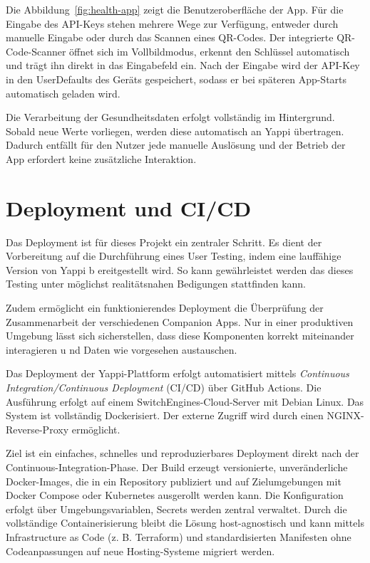 \documentclass[12pt,a4paper]{report}
\begin{document}
Die Abbildung~\ref{fig:health-app} zeigt die Benutzeroberfläche der App. Für die Eingabe des API-Keys stehen mehrere Wege zur
Verfügung, entweder durch manuelle Eingabe oder durch das Scannen eines QR-Codes. Der integrierte QR-Code-Scanner öffnet sich im
Vollbildmodus, erkennt den Schlüssel automatisch und trägt ihn direkt in das Eingabefeld ein. Nach der Eingabe wird der API-Key
in den UserDefaults des Geräts gespeichert, sodass er bei späteren App-Starts automatisch geladen wird.

Die Verarbeitung der Gesundheitsdaten erfolgt vollständig im Hintergrund. Sobald neue Werte vorliegen, werden diese automatisch an
Yappi übertragen. Dadurch entfällt für den Nutzer jede manuelle Auslösung und der Betrieb der App erfordert keine zusätzliche
Interaktion.


\section{Deployment und CI/CD}

    Das Deployment ist für dieses Projekt ein zentraler Schritt.
    Es dient der Vorbereitung auf die Durchführung eines User Testing, indem eine lauffähige Version von Yappi b
    ereitgestellt wird. So kann gewährleistet werden das dieses Testing unter möglichst realitätsnahen Bedigungen stattfinden kann.

    Zudem ermöglicht ein funktionierendes Deployment die Überprüfung der Zusammenarbeit der verschiedenen Companion Apps.
    Nur in einer produktiven Umgebung lässt sich sicherstellen, dass diese Komponenten korrekt miteinander interagieren u
    nd Daten wie vorgesehen austauschen.

    Das Deployment der Yappi-Plattform erfolgt automatisiert mittels \textit{Continuous Integration/Continuous Deployment}
    (CI/CD) über GitHub Actions. Die Ausführung erfolgt auf einem SwitchEngines-Cloud-Server mit Debian Linux.
    Das System ist vollständig Dockerisiert. Der externe Zugriff wird durch einen NGINX-Reverse-Proxy ermöglicht.

    Ziel ist ein einfaches, schnelles und reproduzierbares Deployment direkt nach der Continuous-Integration-Phase.
    Der Build erzeugt versionierte, unveränderliche Docker-Images, die in ein Repository publiziert und auf
    Zielumgebungen mit Docker Compose oder Kubernetes ausgerollt werden kann. Die Konfiguration erfolgt über
    Umgebungsvariablen, Secrets werden zentral verwaltet. Durch die vollständige Containerisierung bleibt die Lösung
    host-agnostisch und kann mittels Infrastructure as Code (z. B. Terraform) und standardisierten Manifesten
    ohne Codeanpassungen auf neue Hosting-Systeme migriert werden.
\end{document}
